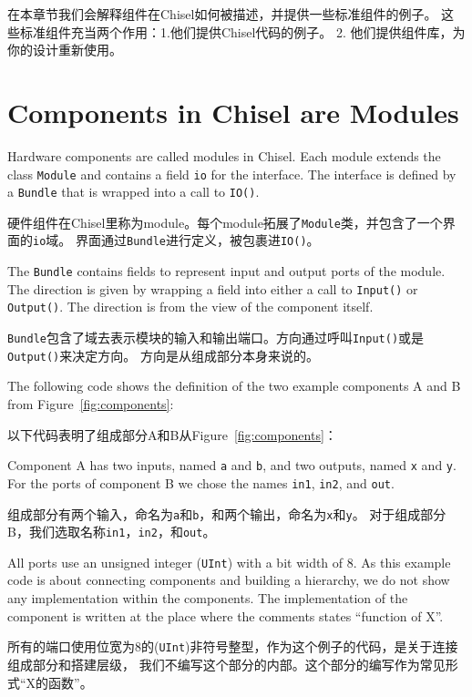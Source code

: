 \documentclass[%
    10pt,
    headinclude, footexclude,
    openright, %
    notitlepage,
    cleardoubleempty,
    headsepline,
    pointlessnumbers,
    bibtotoc, idxtotoc,
    ]{scrbook}
\newcommand{\code}[1]{{\small{\texttt{#1}}}}
\begin{document}
在本章节我们会解释组件在Chisel如何被描述，并提供一些标准组件的例子。
这些标准组件充当两个作用：1.他们提供Chisel代码的例子。
2. 他们提供组件库，为你的设计重新使用。

\section{Components in Chisel are Modules}

Hardware components are called modules in Chisel. Each module extends
the class \code{Module} and contains a field \code{io} for the interface.
The interface is defined by a \code{Bundle} that is wrapped into a call to \code{IO()}.

硬件组件在Chisel里称为module。每个module拓展了\code{Module}类，并包含了一个界面的\code{io}域。
界面通过\code{Bundle}进行定义，被包裹进\code{IO()}。

The \code{Bundle} contains fields to represent input and output ports of
the module. The direction is given by wrapping a field into either a call to \code{Input()}
or \code{Output()}. The direction is from the view of the component itself.

\code{Bundle}包含了域去表示模块的输入和输出端口。方向通过呼叫\code{Input()}或是\code{Output()}来决定方向。
方向是从组成部分本身来说的。

The following code shows the definition of the two example components A and B from
Figure~\ref{fig:components}:

以下代码表明了组成部分A和B从Figure~\ref{fig:components}：


\noindent Component A has two inputs, named \code{a} and \code{b}, and two
outputs, named \code{x} and \code{y}. For the ports of component B
we chose the names \code{in1}, \code{in2}, and \code{out}.

\noindent 组成部分有两个输入，命名为\code{a}和\code{b}，和两个输出，命名为\code{x}和\code{y}。
对于组成部分B，我们选取名称\code{in1}，\code{in2}，和\code{out}。

All ports use an unsigned integer (\code{UInt}) with a bit width of 8.
As this example code is about connecting components and building a
hierarchy, we do not show any implementation within the components.
The implementation of the component is written at the place where
the comments states ``function of X''.

所有的端口使用位宽为8的(\code{UInt})非符号整型，作为这个例子的代码，是关于连接组成部分和搭建层级，
我们不编写这个部分的内部。这个部分的编写作为常见形式``X的函数''。
\end{document}
